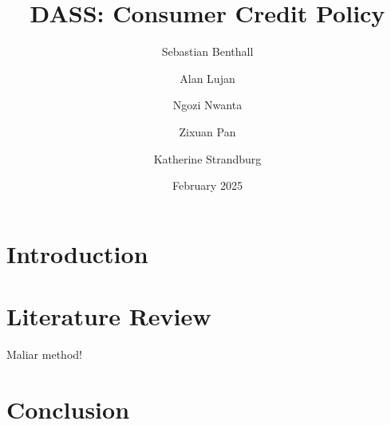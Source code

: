 \documentclass[acmsmall]{acmart}
\title{DASS: Consumer Credit Policy}
\author{Sebastian Benthall}
\author{Alan Lujan}
\author{Ngozi Nwanta}
\author{Zixuan Pan}
\author{Katherine Strandburg}
\date{February 2025}
\begin{document}
\maketitle

\section{Introduction}

\section{Literature Review}

Maliar method! \cite{maliar2021deep}

\section{Conclusion}





\end{document}
